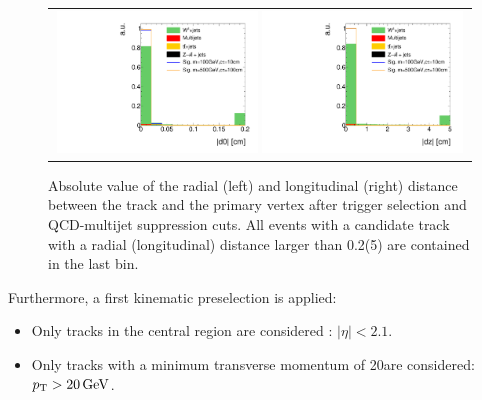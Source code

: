 \begin{figure}[!t]
  \centering 
  \begin{tabular}{c}
    \includegraphics[width=0.49\textwidth]{figures/analysis/AnalysisSelection/chiTracksQCDsupressionTrigger_2Signals_FullBkg/htrackd0_lin.pdf}
    \includegraphics[width=0.49\textwidth]{figures/analysis/AnalysisSelection/chiTracksQCDsupressionTrigger_2Signals_FullBkg/htrackdz_lin.pdf}
  \end{tabular}
  \caption{Absolute value of the radial (left) and longitudinal (right) distance between the track and the primary vertex after trigger selection and QCD-multijet suppression cuts. 
           All events with a candidate track with a radial (longitudinal) distance larger than 0.2\cm (5\cm) are contained in the last bin.}
  \label{fig:d0_dz}
\end{figure}

Furthermore, a first kinematic preselection is applied:
\begin{itemize}
\renewcommand{\labelitemi}{\footnotesize{\ding{118}}}
\item Only tracks in the central region are considered : $|\eta|<2.1$.
\item Only tracks with a minimum transverse momentum of 20\gev are considered:\\
       \mbox{$p_{\text{T}}>20\,\text{Ge}\kern-0.06667em\text{V}$}.\\
\end{itemize}

